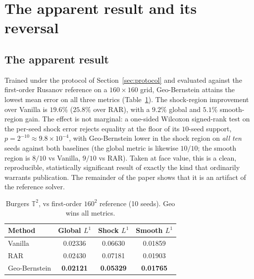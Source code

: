 \documentclass[11pt]{article}
\begin{document}
\section{The apparent result and its reversal}\label{sec:reversal}
\subsection{The apparent result}\label{sec:apparent}
Trained under the protocol of Section~\ref{sec:protocol} and evaluated against
the first-order Rusanov reference on a $160\times160$ grid, Geo-Bernstein attains
the lowest mean error on all three metrics (Table~\ref{tab:apparent}). The
shock-region improvement over Vanilla is $19.6\%$ ($25.8\%$ over RAR), with a
$9.2\%$ global and $5.1\%$ smooth-region gain. The effect is not marginal: a
one-sided Wilcoxon signed-rank test on the per-seed shock error rejects equality
at the floor of its $10$-seed support, $p=2^{-10}\approx 9.8\times10^{-4}$, with
Geo-Bernstein lower in the shock region on \emph{all ten} seeds against both
baselines (the global metric is likewise $10/10$; the smooth region is $8/10$ vs
Vanilla, $9/10$ vs RAR). Taken at face
value, this is a clean, reproducible, statistically significant result of exactly
the kind that ordinarily warrants publication. The remainder of the paper shows
that it is an artifact of the reference solver.
\begin{table}[t]\centering
\caption{Burgers $\mathbb{T}^2$, vs first-order $160^2$ reference (10 seeds). Geo wins all metrics.}\label{tab:apparent}
\begin{tabular}{lccc}\toprule
Method & Global $L^1$ & Shock $L^1$ & Smooth $L^1$ \\ \midrule
Vanilla & 0.02336 & 0.06630 & 0.01859 \\
RAR & 0.02430 & 0.07181 & 0.01903 \\
Geo-Bernstein & \textbf{0.02121} & \textbf{0.05329} & \textbf{0.01765} \\
\bottomrule
\end{tabular}
\end{table}
\end{document}
